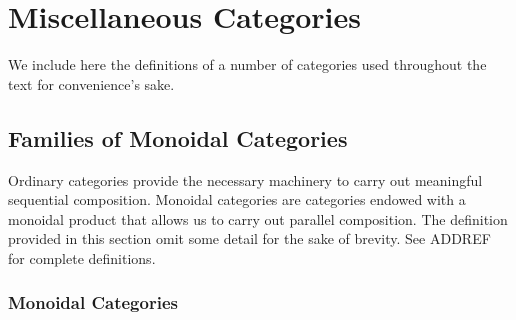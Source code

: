 \documentclass[12pt,a4paper,openright,twoside]{report}
\theoremstyle{plain}
\theoremstyle{definition}
\begin{document}
\clearpage{\pagestyle{empty}\cleardoublepage}














{\footnotesize }



\clearpage{\pagestyle{empty}\cleardoublepage}




\appendix
\chapter{Miscellaneous Categories}


We include here the definitions of a number of categories used throughout the text for convenience’s sake.



\section{Families of Monoidal Categories}

Ordinary categories provide the necessary machinery to carry out meaningful sequential composition. Monoidal categories are categories endowed with a monoidal product that allows us to carry out parallel composition. The definition provided in this section omit some detail for the sake of brevity. See ADDREF for complete definitions.

\subsection{Monoidal Categories}
\end{document}
